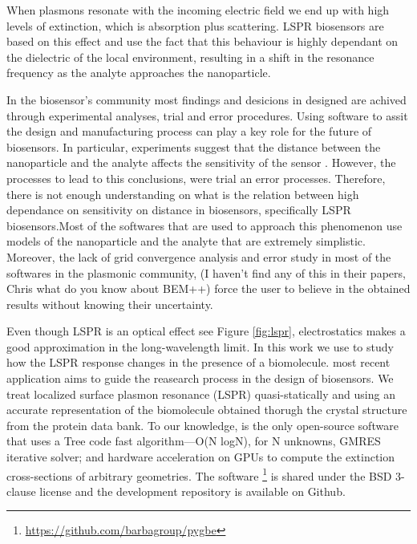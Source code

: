 When plasmons resonate with the incoming electric field we end up with high 
levels of extinction, which is absorption plus scattering. LSPR biosensors are 
based on this effect and use the fact that this behaviour is highly dependant
on the dielectric of the local environment, resulting in a shift in the 
resonance frequency as the analyte approaches the nanoparticle.  


In the biosensor's community most findings and desicions in designed are achived 
through experimental analyses, trial and error procedures. Using software to 
assit the design and manufacturing process can play a key role for the future
of biosensors. In particular, experiments suggest that the distance between the
nanoparticle and the analyte affects the sensitivity of the sensor
\cite{HaesETal2004}. However, the processes to lead to this conclusions, were 
trial an error processes. Therefore, there is not enough understanding on what 
is the relation between high dependance on sensitivity on distance in 
biosensors, specifically LSPR biosensors.Most of the softwares that are used to 
approach this phenomenon use models of 
the nanoparticle and the analyte that are extremely simplistic. Moreover, the 
lack of grid convergence analysis and error study in most of the softwares in 
the plasmonic community, {\color{red}(I haven't find any of this in 
their papers, Chris what do you know about BEM++)} force the user to believe 
in the obtained results without knowing their uncertainty.


Even though LSPR is an optical effect see Figure \ref{fig:lspr}, electrostatics 
makes a good approximation in the long-wavelength limit. In this work we use
\pygbe to study how the LSPR response changes in the presence
of a biomolecule. \pygbe most recent application \cite{ClementiETal2017} aims 
to guide the reasearch process in the design of biosensors. We treat localized 
surface plasmon resonance (LSPR) quasi-statically \cite{MayergoyzZhang2007} and
using an accurate representation of the biomolecule obtained thorugh the 
crystal structure from the protein data bank. To our knowledge, \pygbe is the 
only open-source software that uses a Tree code fast algorithm—O(N logN), for 
N unknowns, GMRES iterative solver; and hardware acceleration on GPUs to compute
the extinction cross-sections of arbitrary geometries. The software
\footnote{\url{https://github.com/barbagroup/pygbe}} is shared under the 
BSD 3-clause license and the development repository is available on Github.

